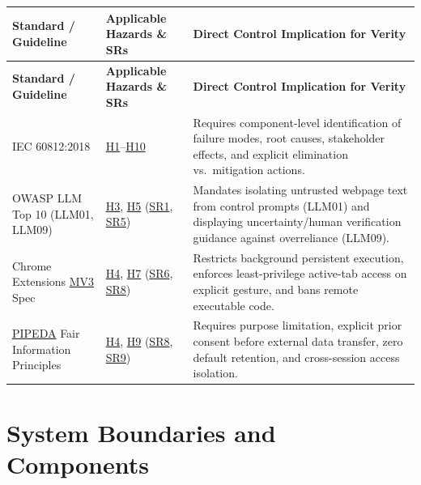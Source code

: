 \documentclass[11pt]{article}
\newcommand{\MVThree}{\hyperlink{ha-acr-mv3}{MV3}}
\newcommand{\PIPEDA}{\hyperlink{ha-acr-pipeda}{PIPEDA}}
\begin{document}
\begin{tabularx}{\textwidth}{P{3.6cm} P{3.6cm} Y}
\caption{Standards Directly Informing Hazard Controls} \label{TblHAStandards}\\
\toprule
\textbf{Standard / Guideline} & \textbf{Applicable Hazards \& SRs} & \textbf{Direct Control Implication for Verity}\\
\midrule
\endfirsthead
\toprule
\textbf{Standard / Guideline} & \textbf{Applicable Hazards \& SRs} & \textbf{Direct Control Implication for Verity}\\
\midrule
\endhead
\bottomrule
\endfoot
IEC 60812:2018 \cite{IEC60812} & \hyperref[haz:H1]{H1}--\hyperref[haz:H10]{H10} & Requires component-level identification of failure modes, root causes, stakeholder effects, and explicit elimination vs.\ mitigation actions.\\
\midrule
OWASP LLM Top 10 (LLM01, LLM09) \cite{OWASPLLM} & \hyperref[haz:H3]{H3}, \hyperref[haz:H5]{H5} (\hyperref[SR1]{SR1}, \hyperref[SR5]{SR5}) & Mandates isolating untrusted webpage text from control prompts (LLM01) and displaying uncertainty/human verification guidance against overreliance (LLM09).\\
\midrule
Chrome Extensions \MVThree{} Spec \cite{ChromeMV3Spec} & \hyperref[haz:H4]{H4}, \hyperref[haz:H7]{H7} (\hyperref[SR6]{SR6}, \hyperref[SR8]{SR8}) & Restricts background persistent execution, enforces least-privilege active-tab access on explicit gesture, and bans remote executable code.\\
\midrule
\PIPEDA{} Fair Information Principles \cite{PIPEDA} & \hyperref[haz:H4]{H4}, \hyperref[haz:H9]{H9} (\hyperref[SR8]{SR8}, \hyperref[SR9]{SR9}) & Requires purpose limitation, explicit prior consent before external data transfer, zero default retention, and cross-session access isolation.\\
\end{tabularx}

\section{System Boundaries and Components}\label{sec:boundaries}
\end{document}
